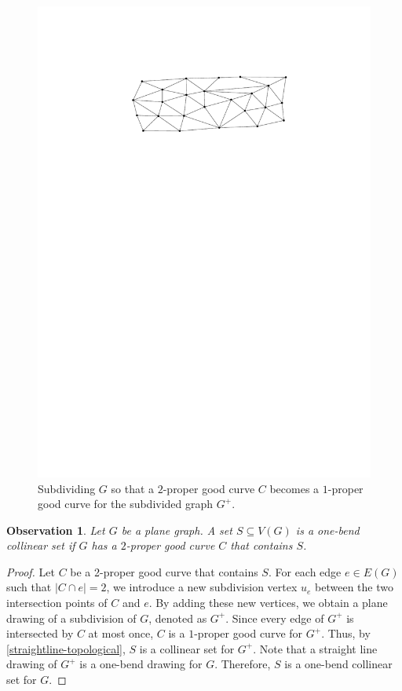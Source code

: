 \documentclass{article}
\newtheorem{obs}{Observation}
\theoremstyle{definition}
\begin{document}
\begin{figure} [htbp]
  \includegraphics[page=7]{figs/proper_good}
  \caption{Subdividing $G$ so that a $2$-proper good curve $C$ becomes a $1$-proper good curve for the subdivided graph $G^+$.}
  \label{subdivisions}
\end{figure}

\begin{obs} \label{1-bend-topological}
    Let $G$ be a plane graph. A set $S \subseteq V(G)$ is a one-bend collinear set if $G$ has a $2$-proper good curve $C$ that contains $S$.
\end{obs}

\begin{proof}
Let $C$ be a 2-proper good curve that contains $S$. For each edge $e \in E(G)$ such that $|C \cap e| = 2$, we introduce a new subdivision vertex $u_e$ between the two intersection points of $C$ and $e$. By adding these new vertices, we obtain a plane drawing of a subdivision of $G$, denoted as $G^+$. Since every edge of $G^+$ is intersected by $C$ at most once, $C$ is a $1$-proper good curve for $G^+$. Thus, by \cref{straightline-topological}, $S$ is a collinear set for $G^+$. Note that a straight line drawing of $G^+$ is a one-bend drawing for $G$. Therefore, $S$ is a one-bend collinear set for $G$.
\end{proof}
\end{document}
